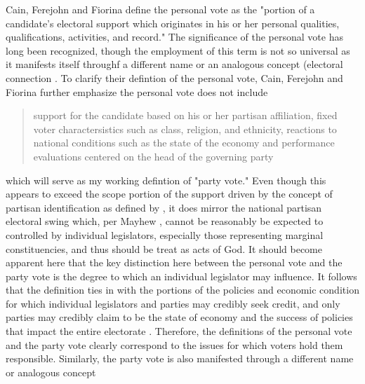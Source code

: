 \documentclass[hyphens, crop=false]{standalone}
\begin{document}
		
		Cain, Ferejohn and Fiorina
		\autocite*{cainPersonalVoteConstituency1987}
		define the personal vote as the "portion of a candidate's electoral support which originates in his or her
		personal qualities,
		qualifications,
		activities,
		and record." 
		\autocite*[9]{cainPersonalVoteConstituency1987}
		The significance of the personal vote has long been recognized,
		though the employment of this term is not so universal as it manifests itself throughf a different name or an analogous concept
		(electoral connection
		\autocites[home style][]{fennoHomeStyleHouse1978}[electoral connection][]{mayhewCongressElectoralConnection1974}[personal reputation][]{careyIncentivesCultivatePersonal1995}[dyadic representation][]{millerConstituencyInfluenceCongress1963}{weissbergCollectiveVsDyadic1978}{ansolabehereDyadicRepresentation2011}[personal representation][]{colomerPersonalRepresentationNeglected2011}[local vote][]{pattieWinningLocalVote1995}.
		To clarify their defintion of the personal vote,
		Cain, Ferejohn and Fiorina
		\autocite*[9]{cainPersonalVoteConstituency1987}
		further emphasize the personal vote does not include
		\begin{quotation}
			support for the candidate based on his or her partisan affiliation, fixed voter charactersistics such as class, religion, and ethnicity, reactions to national conditions such as the state of the economy and performance evaluations centered on the head of the governing party
		\end{quotation}
		which will serve as my working defintion of "party vote." Even though this appears to exceed the scope portion of the support driven by the concept of partisan identification as defined by
		\citeauthor{campbellAmericanVoter1960}
		\autocite*[121]{campbellAmericanVoter1960},
		it does mirror the national partisan electoral swing which,
		per
		Mayhew
		\autocite*[28,32]{mayhewCongressElectoralConnection1974},
		cannot be reasonably be expected to controlled by
		individual legislators,
		especially those representing marginal constituencies,
		and thus should be treat as acts of God.
		It should become apparent here that
		the key distinction here between the personal vote and the party vote is
		the degree to which an individual legislator may influence.
		It follows that the definition ties in with
		the portions of the policies and economic condition
		for which individual legislators and parties may credibly seek credit,
		and only parties may credibly claim to be the state of economy and the success of policies that impact the entire electorate
		\autocite{mayhewCongressElectoralConnection1974}.
		Therefore,
		the definitions of the personal vote and the party vote clearly correspond to the issues for which voters hold them responsible. Similarly,
		the party vote is also manifested through a different name or analogous concept
		\autocites[partisan representation][]{hurleyPartisanRepresentationRealignment1991}[collective representation][]{weissbergCollectiveVsDyadic1978}[normal vote][]{converseConceptNormalVote1966}[partisan reputation][]{careyIncentivesCultivatePersonal1995}
	
		
	
	
\end{document}
